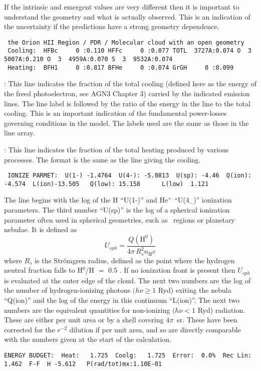 If the intrinsic and emergent values are very different then it is
important to understand the geometry and what is actually observed.
This
is an indication of the uncertainty if the predictions have a strong
geometry dependence.
{\setverbatimfontsize{\tiny}
\begin{verbatim}
 the Orion HII Region / PDR / Molecular cloud with an open geometry
 Cooling:  HFBc     0 :0.110 HFFc     0 :0.077 TOTL  3727A:0.074 O  3  5007A:0.210 O  3  4959A:0.070 S  3  9532A:0.074
 Heating:  BFH1     0 :0.817 BFHe     0 :0.074 GrGH     0 :0.099
\end{verbatim}
}

:  This line indicates the fraction of the total cooling (defined
here as the energy of the freed photoelectron, see AGN3 Chapter 3) carried
by the indicated emission lines.
The line label is followed by the ratio
of the energy in the line to the total cooling.
This is an important
indication of the fundamental power-losses governing conditions in the model.
The labels used are the same as those in the line array.

:  This line indicates the fraction of the total heating produced
by various processes.  The format is the same as the line giving the cooling.
{\setverbatimfontsize{\tiny}
\begin{verbatim}
 IONIZE PARMET:  U(1-) -1.4764  U(4-): -5.0813  U(sp): -4.46  Q(ion):   -4.574  L(ion)-13.505   Q(low): 15.158      L(low)  1.121
\end{verbatim}
}

The line begins with the log of the H ``U(1-)'' and He$^+$ ``U(4$_-$)''
ionization parameters.
The third number ``U(sp)'' is the log of a spherical
ionization parameter often used in spherical geometries,
such as \hii\ regions or planetary nebulae.
It is defined as
\begin{equation}
{U_{sph}} = \frac{{Q\left( {{{\mathrm{H}}^{\mathrm{0}}}} \right)}}{{4\pi
\,R_s^2{n_{\mathrm{H}}}c}}%
\end{equation}
where $R_s$ is the Str\"omgren radius,
defined as the point where the hydrogen
neutral fraction falls to H$^0$/H $=$ 0.5 .
If no ionization front is present
then $U_{sph}$ is evaluated at the outer edge of the cloud.
The next two numbers
are the log of the number of hydrogen-ionizing photons
$(h\nu \ge 1$ Ryd) exiting
the nebula ``Q(ion)'' and the log of the energy
in this continuum ``L(ion)''.
The next two numbers are the equivalent quantities for
non-ionizing $(h\nu < 1$ Ryd) radiation.
These are either per unit area or by a shell covering
$4\pi$~sr.
These have been corrected for the $r^{-2}$ dilution if per unit area,
and so are directly comparable with the numbers given at the start of the
calculation.
{\setverbatimfontsize{\tiny}
\begin{verbatim}
ENERGY BUDGET:  Heat:   1.725  Coolg:   1.725  Error:  0.0%  Rec Lin:   1.462  F-F  H -5.612   P(rad/tot)mx:1.10E-01
\end{verbatim}
}


